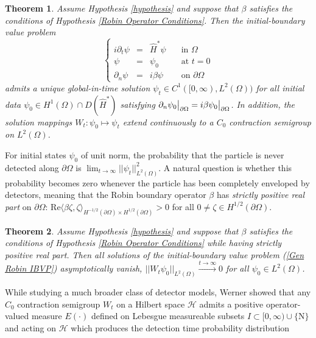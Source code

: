 \documentclass{article}
\numberwithin{equation}{section}
\newtheorem{theoremmain}{Theorem}
\begin{document}
\begin{theoremmain}\label{main Robin}
   Assume Hypothesis \ref{hypothesis} and suppose that $\beta$ satisfies the conditions of Hypothesis \ref{Robin Operator Conditions}. Then the initial-boundary value problem 
   \em \begin{equation}\label{Gen Robin IBVP}
\left\{\begin{array}{rclr}
       i \partial_t \psi&=& \hat{H}^* \psi \quad &\text{in } \Omega
       \\
       \psi &=&\psi_0 \quad &\text{at } t=0
       \\
       \partial_n \psi&=&i \beta \psi \quad &\text{on } \partial \Omega
    \end{array}
    \right.
    \end{equation}
    admits a unique global-in-time solution $\psi_t\in C^1([0,\infty),L^2(\Omega))$ for all initial data $\psi_0 \in H^1(\Omega)\cap D(\hat{H}^*)$ satisfying $\partial_n \psi_0 \big{|}_{\partial \Omega}=i \beta \psi_0 \big{|}_{\partial \Omega}$. In addition, the solution mappings $W_t:\psi_0 \mapsto \psi_t$ extend continuously to a $C_0$ contraction semigroup on $L^2(\Omega)$.
\end{theoremmain}
For initial states $\psi_0$ of unit norm, the probability that the particle is never detected along $\partial \Omega$ is $\lim_{t \to \infty}||\psi_t||_{L^2(\Omega)}^2$. A natural question is whether this probability becomes zero whenever the particle has been  completely enveloped by detectors, meaning that the Robin boundary operator $\beta$ has \textit{strictly positive real part} on $\partial \Omega$: $\text{Re}\langle \beta \zeta, \zeta \rangle_{H^{-1/2}(\partial \Omega)\times H^{1/2}(\partial \Omega)}>0$ for all $0\neq \zeta \in H^{1/2}(\partial \Omega)$.
\begin{theoremmain}\label{main Robin stability}
Assume Hypothesis \ref{hypothesis} and suppose that $\beta$ satisfies the conditions of Hypothesis \ref{Robin Operator Conditions} while having strictly positive real part. Then all solutions of the initial-boundary value problem (\ref{Gen Robin IBVP}) asymptotically vanish, $||W_t\psi_0||_{L^2(\Omega)}\xrightarrow{t \to \infty}0$ for all $\psi_0 \in L^2(\Omega)$.
\end{theoremmain}
While studying a much broader class of detector models, Werner \cite{Werner1987} showed that any $C_0$ contraction semigroup $W_t$ on a Hilbert space $\mathcal{H}$ admits a positive operator-valued measure $E(\cdot)$ defined on Lebesgue measureable subsets $I \subset [0,\infty)\cup \{\text{N}\}$ and acting on $\mathcal{H}$ which produces the detection time probability distribution
\end{document}

